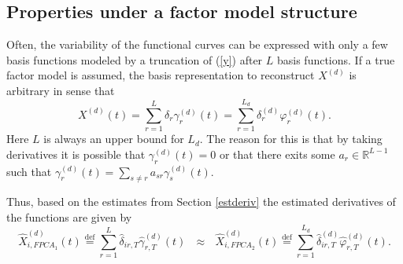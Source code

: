 \subsection{Properties under a factor model structure}
\label{Lchoi}
Often, the variability of the functional curves can be expressed with only a few basis functions modeled by a truncation of (\ref{y}) after $L$ basis functions.
If a true factor model is assumed, the basis representation to reconstruct $X^{(d)}$ is arbitrary in sense that
\begin{equation}\label{approx11}
X^{(d)}(t) =  \sum_{r=1}^{L}  \delta_{r} \gamma^{(d)}_{r}(t)= \sum_{r=1}^{L_d}  \delta_{r}^{(d)} \varphi^{(d)}_{r}(t).  
\end{equation}
Here $L$ is always an upper bound for $L_d$. %
The reason for this is that by taking derivatives it is possible that $\gamma_r^{(d)}(t)=0$ or that there exits some $a_r\in \mathbb{R}^{L-1}$ such that $\gamma_r^{(d)}(t)= \sum_{s\neq r}  a_{sr} \gamma_s^{(d)}(t)$.

Thus, based on the estimates from Section \ref{estderiv} the estimated derivatives of the functions are  given by
\begin{equation}\label{approx12}
\hat{X}^{(d)}_{i,FPCA_1}(t)\stackrel{\operatorname{def}}{=} \sum_{r=1}^{L}  \hat{\delta}_{ir,T} \hat{\gamma}^{(d)}_{r,T}(t) \mbox{  } \approx \mbox{  } \hat{X}^{(d)}_{i,FPCA_2}(t) \stackrel{\operatorname{def}}{=} \sum_{r=1}^{L_d}  \hat{\delta}_{ir,T}^{(d)} \hat{\varphi}^{(d)}_{r,T}(t).  
\end{equation}

